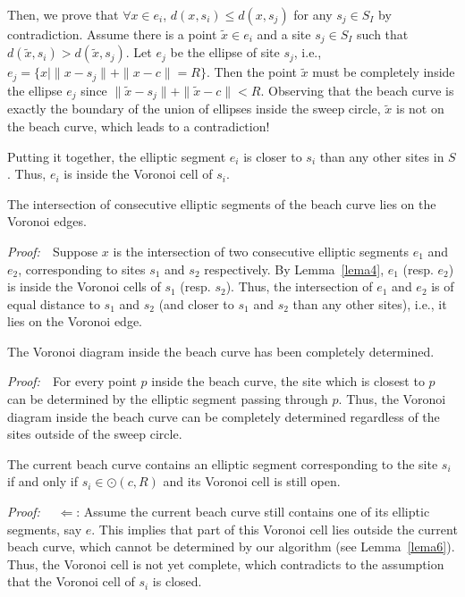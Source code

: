 {{Then, we prove that $\forall x\in e_i$, $d(x,s_i)\leq d(x,s_j)$ for
any $s_j\in S_I$ by contradiction. Assume there is a point
$\tilde{x}\in e_i$ and a site $s_j\in S_I$ such that
$d(\tilde{x},s_i)> d(\tilde{x},s_j)$. Let $e_j$ be the ellipse of
site $s_j$, i.e., $e_j=\{x|\|x-s_j\|+\|x-c\|=R\}$. Then the point
$\tilde{x}$ must be completely inside the ellipse $e_j$ since
$\|\tilde{x}-s_j\|+\|\tilde{x}-c\|<R$. Observing that the beach
curve is exactly the boundary of the union of ellipses inside the
sweep circle, $\tilde{x}$ is not on the beach curve, which leads to
a contradiction!

Putting it together, the elliptic segment $e_i$ is closer to $s_i$
than any other sites in $S$. Thus, $e_i$ is inside the Voronoi cell
of $s_i$.

\vspace{0.1in}
\begin{lemma}\label{lema5}
The intersection of consecutive elliptic segments of the beach curve
lies on the Voronoi edges.
\end{lemma}
\vspace{0.1in}\noindent\textit{Proof:}~~Suppose $x$ is the
intersection of two consecutive elliptic segments $e_1$ and $e_2$,
corresponding to sites $s_1$ and $s_2$ respectively. By
Lemma~\ref{lema4}, $e_1$ (resp. $e_2$) is inside the Voronoi cells
of $s_1$ (resp. $s_2$). Thus, the intersection of $e_1$ and $e_2$ is
of equal distance to $s_1$ and $s_2$ (and closer to $s_1$ and $s_2$
than any other sites), i.e., it lies on the Voronoi edge.

\vspace{0.1in}
\begin{lemma}\label{lema6}
The Voronoi diagram inside the beach curve has been completely
determined.
\end{lemma}
\vspace{0.1in}\noindent\textit{Proof:}~~For every point $p$ inside
the beach curve, the site which is closest to $p$ can be determined
by the elliptic segment passing through $p$. Thus, the Voronoi
diagram inside the beach curve can be completely determined
regardless of the sites outside of the sweep circle. %

\vspace{0.1in}\begin{lemma}\label{lema7} The current beach curve
contains an elliptic segment corresponding to the site $s_i$ if and
only if $s_i\in\odot(c,R)$ and its Voronoi cell is still open.
\end{lemma}
\vspace{0.1in}\noindent\textit{Proof:}~~ $\Leftarrow$: Assume the
current beach curve still contains one of its elliptic segments, say
$e$. This implies that part of this Voronoi cell lies outside the
current beach curve, which cannot be determined by our algorithm
(see Lemma~\ref{lema6}). Thus, the Voronoi cell is not yet complete,
which contradicts to the assumption that the Voronoi cell of $s_i$
is closed.

}}
